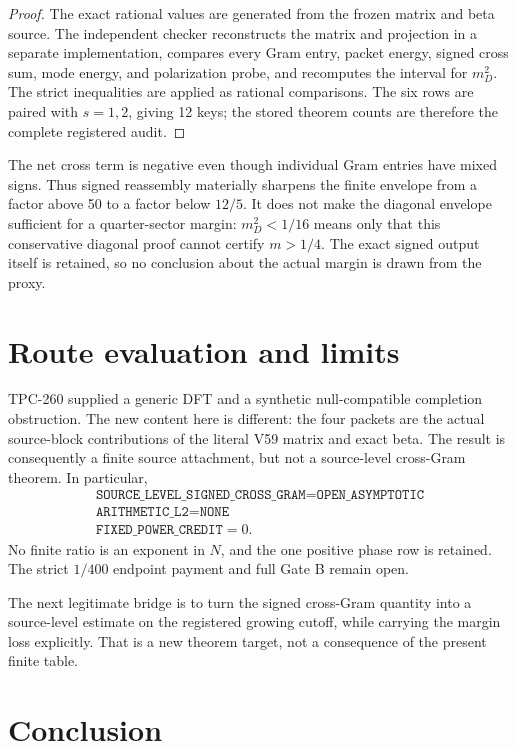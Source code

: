 \documentclass[11pt]{article}
\begin{document}
\begin{proof}
The exact rational values are generated from the frozen matrix and beta source.
The independent checker reconstructs the matrix and projection in a separate
implementation, compares every Gram entry, packet energy, signed cross sum,
mode energy, and polarization probe, and recomputes the interval for \(m_D^2\).
The strict inequalities are applied as rational comparisons.  The six rows are
paired with \(s=1,2\), giving 12 keys; the stored theorem counts are therefore
the complete registered audit.
\end{proof}

The net cross term is negative even though individual Gram entries have mixed
signs.  Thus signed reassembly materially sharpens the finite envelope from a
factor above 50 to a factor below \(12/5\).  It does not make the diagonal
envelope sufficient for a quarter-sector margin: \(m_D^2<1/16\) means only
that this conservative diagonal proof cannot certify \(m>1/4\).  The exact
signed output itself is retained, so no conclusion about the actual margin is
drawn from the proxy.

\section{Route evaluation and limits}

TPC-260 supplied a generic DFT and a synthetic null-compatible completion
obstruction.  The new content here is different: the four packets are the
actual source-block contributions of the literal V59 matrix and exact beta.
The result is consequently a finite source attachment, but not a source-level
cross-Gram theorem.  In particular,
\[
 \begin{gathered}
 \texttt{SOURCE\_LEVEL\_SIGNED\_CROSS\_GRAM}=\texttt{OPEN\_ASYMPTOTIC}\\
 \texttt{ARITHMETIC\_L2}=\texttt{NONE}\\
 \texttt{FIXED\_POWER\_CREDIT}=0.
 \end{gathered}
\]
No finite ratio is an exponent in \(N\), and the one positive phase row is
retained.  The strict \(1/400\) endpoint payment and full Gate B remain open.

The next legitimate bridge is to turn the signed cross-Gram quantity into a
source-level estimate on the registered growing cutoff, while carrying the
margin loss explicitly.  That is a new theorem target, not a consequence of
the present finite table.

\section{Conclusion}
\end{document}
